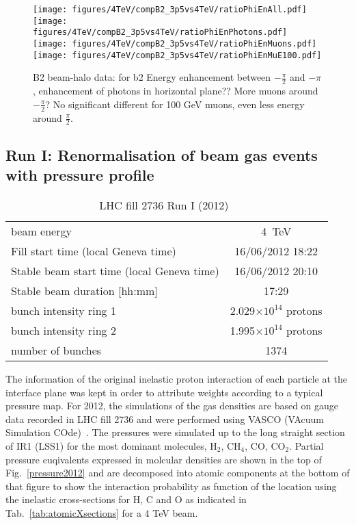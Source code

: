 \begin{figure}
\begin{center}
  \texttt{[image: figures/4TeV/compB2\_3p5vs4TeV/ratioPhiEnAll.pdf]}
  \texttt{[image: figures/4TeV/compB2\_3p5vs4TeV/ratioPhiEnPhotons.pdf]}
  \texttt{[image: figures/4TeV/compB2\_3p5vs4TeV/ratioPhiEnMuons.pdf]}
  \texttt{[image: figures/4TeV/compB2\_3p5vs4TeV/ratioPhiEnMuE100.pdf]}
\end{center}
\vspace{-0.6cm}
 \caption{B2 beam-halo data: for b2 Energy enhancement between $-\frac{\pi}{2}$ and $-\pi$, enhancement of photons in horizontal plane?? More muons around $-\frac{\pi}{2}$? No significant different for 100 GeV muons, even less energy around $\frac{\pi}{2}$.
  \label{xingCompBH2}}
\end{figure}


\subsection{Run I: Renormalisation of beam gas events with pressure profile}

\begin{table}
   \centering
   \caption{LHC fill 2736 Run I (2012)~\cite{refAccStats}}
   \begin{tabular}{l||c}
       \hline
       beam energy  & 4~TeV \\
       Fill start time (local Geneva time) & 16/06/2012 18:22\\
       Stable beam start time (local Geneva time) & 16/06/2012 20:10\\
       Stable beam duration [hh:mm] & 17:29\\
       bunch intensity ring 1& 2.029$\times 10^{14}$ protons\\
       bunch intensity ring 2& 1.995$\times 10^{14}$ protons\\
       number of bunches & 1374 \\
       \hline
   \end{tabular}
   \label{tab:fillRunI}
\end{table}

The information of the original inelastic proton interaction of each particle at the interface plane was kept in order to attribute weights according to a typical pressure map. For 2012, the simulations of the gas densities are based on gauge data recorded in LHC fill 2736 and were performed using VASCO (VAcuum Simulation COde)~\cite{refVascoCode,nimPaperRod}. The pressures were simulated up to the long straight section of IR1 (LSS1) for the most dominant molecules, H$_2$, CH$_4$, CO, CO$_2$. Partial pressure euqivalents expressed in molcular densities are shown in the top of Fig.~\ref{pressure2012} and are decomposed into atomic components at the bottom of that figure to show the interaction probability as function of the location using the inelastic cross-sections for H, C and O as indicated in Tab.~\ref{tab:atomicXsections} for a 4 TeV beam.

